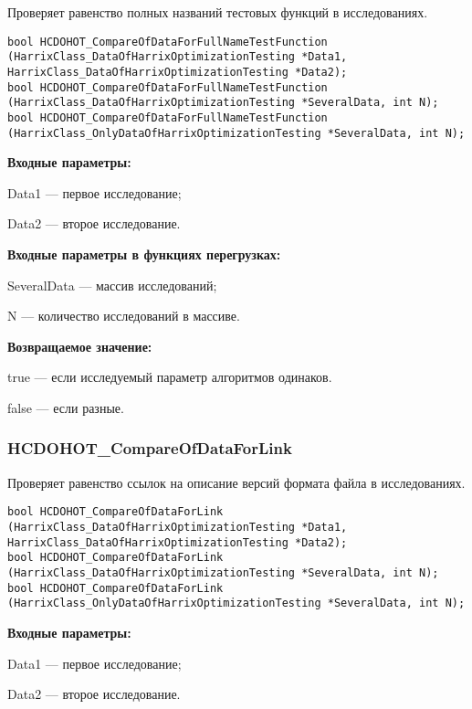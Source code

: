\documentclass[a4paper,12pt]{article}
\begin{document}
Проверяет равенство полных названий тестовых функций в исследованиях.


\begin{lstlisting}[label=code_syntax_HCDOHOT_CompareOfDataForFullNameTestFunction,caption=Синтаксис]
bool HCDOHOT_CompareOfDataForFullNameTestFunction (HarrixClass_DataOfHarrixOptimizationTesting *Data1, HarrixClass_DataOfHarrixOptimizationTesting *Data2);
bool HCDOHOT_CompareOfDataForFullNameTestFunction (HarrixClass_DataOfHarrixOptimizationTesting *SeveralData, int N);
bool HCDOHOT_CompareOfDataForFullNameTestFunction (HarrixClass_OnlyDataOfHarrixOptimizationTesting *SeveralData, int N);
\end{lstlisting}

\textbf{Входные параметры:}

Data1 --- первое исследование;
 
Data2 --- второе исследование.
	 
\textbf{Входные параметры в функциях перегрузках:}

SeveralData --- массив исследований;
 
N --- количество исследований в массиве.

\textbf{Возвращаемое значение:}

true --- если исследуемый параметр алгоритмов одинаков.
 
false --- если разные.


\subsubsection{HCDOHOT\_CompareOfDataForLink}\label{HCDOHOT_CompareOfDataForLink}

Проверяет равенство ссылок на описание версий формата файла в исследованиях.


\begin{lstlisting}[label=code_syntax_HCDOHOT_CompareOfDataForLink,caption=Синтаксис]
bool HCDOHOT_CompareOfDataForLink (HarrixClass_DataOfHarrixOptimizationTesting *Data1, HarrixClass_DataOfHarrixOptimizationTesting *Data2);
bool HCDOHOT_CompareOfDataForLink (HarrixClass_DataOfHarrixOptimizationTesting *SeveralData, int N);
bool HCDOHOT_CompareOfDataForLink (HarrixClass_OnlyDataOfHarrixOptimizationTesting *SeveralData, int N);
\end{lstlisting}

\textbf{Входные параметры:}

Data1 --- первое исследование;
 
Data2 --- второе исследование.
	 
\end{document}

